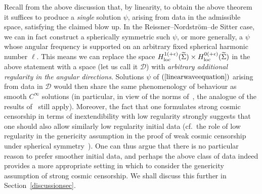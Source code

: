 \documentclass[A4,10pt]{article}
\begin{document}
Recall from the above discussion that, by linearity,  to obtain the above theorem it suffices to produce
a \emph{single} solution $\psi$, arising from data in the admissible  space, 
satisfying the claimed
blow up.
In the Reissner--Nordstr\"om--de Sitter case,
we can  in fact construct a spherically symmetric such $\psi$, or more generally,
 a $\psi$ whose angular frequency is 
supported on an arbitrary
fixed spherical harmonic number $\ell$. 
This means we can replace the space $H^{1(+\epsilon)}_{\rm loc}(\widetilde{\Sigma})\times H^{0(+\epsilon)}_{\rm loc}(\widetilde{\Sigma})$ in the above
statement with
a space (let us call it $\mathcal{D}$)
with \emph{arbitrary additional regularity in the angular directions}. Solutions 
$\psi$ of $(\ref{linearwaveequation})$ arising from  data in $\mathcal{D}$ would then
share the same phenomenology of behaviour as smooth $C^\infty$ solutions
(in particular, in view of the norms of~\cite{Dafermos:2007jd}, the analogue of the
results of~\cite{annefranzen} still apply). 
Moreover, the fact that one formulates strong cosmic censorship in terms
of inextendibility with low regularity strongly suggests that one should also
allow similarly low regularity initial data (cf.~the role of low regularity in 
the genericity assumption in the proof of weak cosmic censorship
under spherical symmetry~\cite{Christodoulou4}).
One can thus argue that there is no particular reason to prefer smoother initial data, and perhaps 
the above class of data indeed provides a more appropriate
setting in which to consider the genericity assumption of strong cosmic censorship.
We shall discuss this further in  Section~\ref{discussionsec}.
\end{document}
